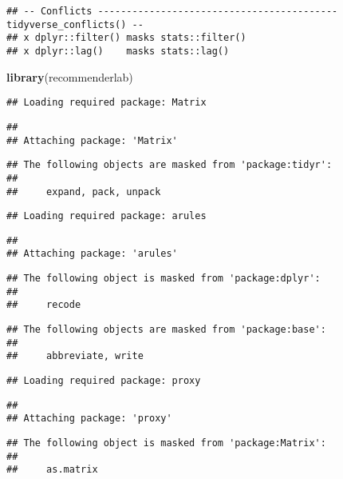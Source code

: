 \documentclass[
]{article}
\newenvironment{Shaded}{\begin{snugshade}}{\end{snugshade}}
\newcommand{\KeywordTok}[1]{\textcolor[rgb]{0.13,0.29,0.53}{\textbf{#1}}}
\newcommand{\NormalTok}[1]{#1}
\begin{document}
\begin{verbatim}
## -- Conflicts ------------------------------------------ tidyverse_conflicts() --
## x dplyr::filter() masks stats::filter()
## x dplyr::lag()    masks stats::lag()
\end{verbatim}

\begin{Shaded}
\begin{Highlighting}[]
\KeywordTok{library}\NormalTok{(recommenderlab)}
\end{Highlighting}
\end{Shaded}

\begin{verbatim}
## Loading required package: Matrix
\end{verbatim}

\begin{verbatim}
## 
## Attaching package: 'Matrix'
\end{verbatim}

\begin{verbatim}
## The following objects are masked from 'package:tidyr':
## 
##     expand, pack, unpack
\end{verbatim}

\begin{verbatim}
## Loading required package: arules
\end{verbatim}

\begin{verbatim}
## 
## Attaching package: 'arules'
\end{verbatim}

\begin{verbatim}
## The following object is masked from 'package:dplyr':
## 
##     recode
\end{verbatim}

\begin{verbatim}
## The following objects are masked from 'package:base':
## 
##     abbreviate, write
\end{verbatim}

\begin{verbatim}
## Loading required package: proxy
\end{verbatim}

\begin{verbatim}
## 
## Attaching package: 'proxy'
\end{verbatim}

\begin{verbatim}
## The following object is masked from 'package:Matrix':
## 
##     as.matrix
\end{verbatim}
\end{document}
